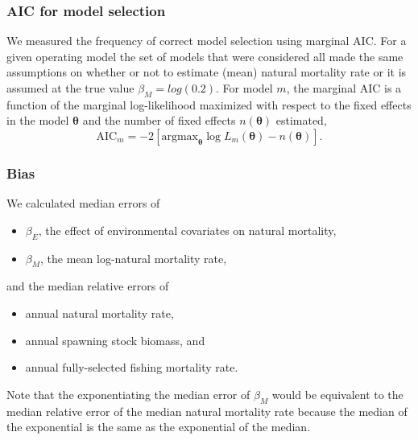 \documentclass[
  12pt,
]{article}
\begin{document}
\hypertarget{aic-for-model-selection}{%
\subsubsection*{AIC for model selection}\label{aic-for-model-selection}}

We measured the frequency of correct model selection using marginal AIC. For a given operating model the set of models that were considered all made the same assumptions on whether or not to estimate (mean) natural mortality rate or it is assumed at the true value \(\beta_M = log(0.2)\). For model \(m\), the marginal AIC is a function of the marginal log-likelihood maximized with respect to the fixed effects in the model \(\boldsymbol{\theta}\) and the number of fixed effects \(n\left(\boldsymbol{\theta}\right)\) estimated,
\[
\text{AIC}_m = -2\left[{\text{argmax}}_{\boldsymbol{\theta}} \log L_m\left({\boldsymbol{\theta}}\right) - n\left({\boldsymbol{\theta}}\right)\right].
\]

\hypertarget{bias}{%
\subsubsection*{Bias}\label{bias}}

We calculated median errors of

\begin{itemize}
\item $\beta_E$, the effect of environmental covariates on natural mortality, 
\item $\beta_M$, the mean log-natural mortality rate,
\end{itemize}

and the median relative errors of

\begin{itemize}
\item annual natural mortality rate,
\item annual spawning stock biomass, and
\item annual fully-selected fishing mortality rate.
\end{itemize}

Note that the exponentiating the median error of \(\beta_M\) would be equivalent to the median relative error of the median natural mortality rate because the median of the exponential is the same as the exponential of the median.
\end{document}
